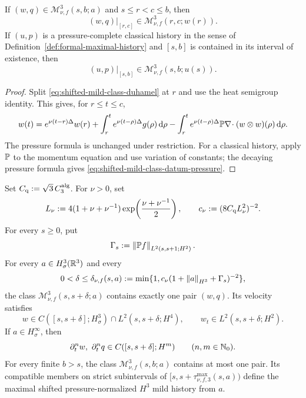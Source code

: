 \begin{lemma}
\label{lem:shifted-mild-restriction}
If \((w,q)\in\mathscr M_{\nu,f}^3(s,b;a)\) and
\(s\le r<c\le b\), then
\begin{equation}
 (w,q)|_{[r,c]}\in\mathscr M_{\nu,f}^3(r,c;w(r)).
 \label{eq:shifted-mild-restriction}
\end{equation}
If \((u,p)\) is a pressure-complete classical history in the sense of
Definition~\ref{def:formal-maximal-history} and
\([s,b]\) is contained in its interval of existence, then
\begin{equation}
 (u,p)|_{[s,b]}\in\mathscr M_{\nu,f}^3(s,b;u(s)).
 \label{eq:classical-mild-admission}
\end{equation}
\end{lemma}

\begin{proof}
Split \eqref{eq:shifted-mild-class-duhamel} at \(r\) and use the heat
semigroup identity.  This gives, for \(r\le t\le c\),
\[
 w(t)=e^{\nu(t-r)\Delta}w(r)
 +\int_r^t e^{\nu(t-\rho)\Delta}g(\rho)\,\mathrm d\rho
 -\int_r^t e^{\nu(t-\rho)\Delta}
 \mathbb P\nabla\!\cdot(w\otimes w)(\rho)\,\mathrm d\rho.
\]
The pressure formula is unchanged under restriction.  For a classical
history, apply \(\mathbb P\) to the momentum equation and use variation of
constants; the decaying pressure formula gives
\eqref{eq:shifted-mild-class-datum-pressure}.
\end{proof}

\begin{theorem}
\label{thm:local-restart}
Set \(C_{\rm q}:=\sqrt3\,C_3^{\rm alg}\).  For \(\nu>0\), set
\[
 L_\nu:=4(1+\nu+\nu^{-1})
 \exp\!\left(\frac{\nu+\nu^{-1}}2\right),
 \qquad
 c_\nu:=(8C_{\rm q}L_\nu^2)^{-2}.
\]
For every \(s\ge0\), put
\[
 \Gamma_s:=\left\lVert \mathbb P f\right\rVert_{L^2(s,s+1;H^2)}.
\]
For every \(a\in H^3_\sigma(\mathbb R^3)\) and every
\[
 0<\delta\le\delta_{\nu,f}(s,a)
 :=\min\{1,c_\nu(1+\left\lVert a\right\rVert_{H^3}+\Gamma_s)^{-2}\},
\]
the class \(\mathscr M_{\nu,f}^3(s,s+\delta;a)\) contains exactly one pair
\((w,q)\).  Its velocity satisfies
\[
 w\in C([s,s+\delta];H^3_\sigma)
 \cap L^2(s,s+\delta;H^4),
 \qquad
 w_t\in L^2(s,s+\delta;H^2).
\]
If \(a\in H^\infty_\sigma\), then
\[
 \partial_t^nw,\ \partial_t^nq
 \in C([s,s+\delta];H^m)
 \qquad(n,m\in\mathbb N_0).
\]
For every finite \(b>s\), the class
\(\mathscr M_{\nu,f}^3(s,b;a)\) contains at most one pair.  Its compatible members
on strict subintervals of
\([s,s+\tau_{\nu,f,3}^{\max}(s,a))\) define the maximal shifted
pressure-normalized \(H^3\) mild history from \(a\).
\end{theorem}

